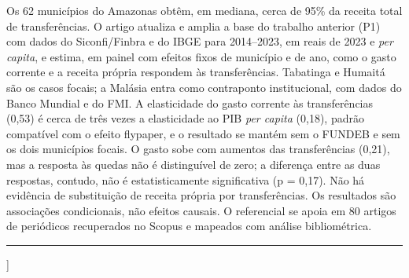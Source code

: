 \documentclass[10pt,twocolumn]{article}
\begin{document}
{\begin{@twocolumnfalse}
\begin{minipage}[t]{0.69\textwidth}
\noindent Os 62 municípios do Amazonas obtêm, em mediana, cerca de 95\% da receita total de transferências. O artigo atualiza e amplia a base do trabalho anterior (P1) com dados do Siconfi/Finbra e do IBGE para 2014--2023, em reais de 2023 e \textit{per capita}, e estima, em painel com efeitos fixos de município e de ano, como o gasto corrente e a receita própria respondem às transferências. Tabatinga e Humaitá são os casos focais; a Malásia entra como contraponto institucional, com dados do Banco Mundial e do FMI. A elasticidade do gasto corrente às transferências (0,53) é cerca de três vezes a elasticidade ao PIB \textit{per capita} (0,18), padrão compatível com o efeito flypaper, e o resultado se mantém sem o FUNDEB e sem os dois municípios focais. O gasto sobe com aumentos das transferências (0,21), mas a resposta às quedas não é distinguível de zero; a diferença entre as duas respostas, contudo, não é estatisticamente significativa (p = 0,17). Não há evidência de substituição de receita própria por transferências. Os resultados são associações condicionais, não efeitos causais. O referencial se apoia em 80 artigos de periódicos recuperados no Scopus e mapeados com análise bibliométrica.
\par\vspace{4pt}
\end{minipage}
\vspace{6pt}\hrule\vspace{10pt}
\end{@twocolumnfalse}
}]
\end{document}
